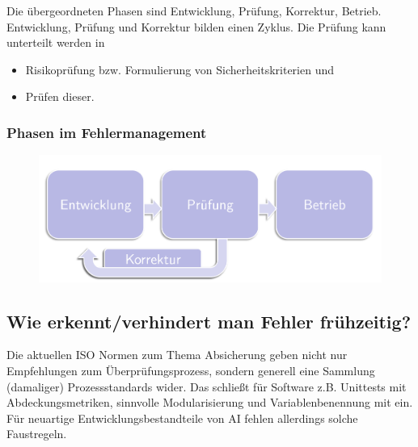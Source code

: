 Die übergeordneten Phasen sind
Entwicklung,
Prüfung,
Korrektur,
Betrieb.
Entwicklung, Prüfung und Korrektur bilden einen Zyklus.
Die Prüfung kann unterteilt werden in
\begin{itemize}
\item Risikoprüfung bzw. Formulierung von Sicherheitskriterien und
\item Prüfen dieser.
\end{itemize}
\begin{frame}\frametitle<presentation>{Phasen im Fehlermanagement}
  \begin{figure}
    \centering
    \includegraphics[width=\textwidth]{lifecycle}
  \end{figure}
\end{frame}


\subsection{Wie erkennt/verhindert man Fehler frühzeitig?}
Die aktuellen ISO Normen zum Thema Absicherung geben nicht nur
Empfehlungen zum Überprüfungsprozess, sondern generell eine
Sammlung (damaliger) Prozessstandards wider. Das schließt für Software
z.B. Unittests mit Abdeckungsmetriken, sinnvolle Modularisierung und
Variablenbenennung mit ein.
Für neuartige Entwicklungsbestandteile von AI fehlen allerdings solche
Faustregeln.

